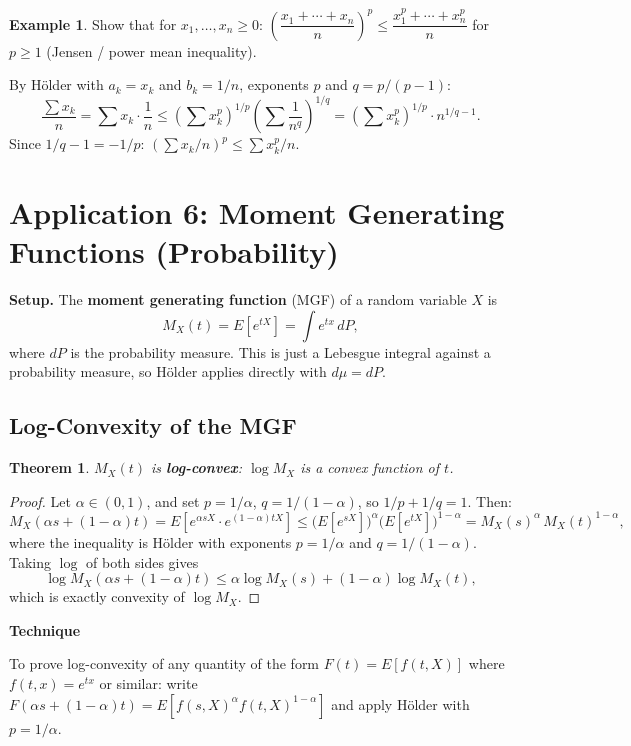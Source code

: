 \documentclass[11pt]{article}
\theoremstyle{myplain}
\newtheorem{theorem}{Theorem}
\theoremstyle{definition}
\newtheorem{example}{Example}
\theoremstyle{remark}
\newenvironment{technique}{%
  \par\smallskip
  \noindent\colorbox{Apricot}{\textbf{Technique}}\enspace\ignorespaces
}{\par\smallskip}
\begin{document}
\begin{example}
Show that for $x_1, \ldots, x_n \geq 0$: $\left(\dfrac{x_1 + \cdots + x_n}{n}\right)^p \leq \dfrac{x_1^p + \cdots + x_n^p}{n}$ for $p \geq 1$ (Jensen / power mean inequality).

By H\"{o}lder with $a_k = x_k$ and $b_k = 1/n$, exponents $p$ and $q = p/(p-1)$:
\[
  \frac{\sum x_k}{n} = \sum x_k \cdot \frac{1}{n} \leq \left(\sum x_k^p\right)^{1/p}\!\left(\sum \frac{1}{n^q}\right)^{1/q} = \left(\sum x_k^p\right)^{1/p} \cdot n^{1/q - 1}.
\]
Since $1/q - 1 = -1/p$: $\left(\sum x_k/n\right)^p \leq \sum x_k^p / n$.
\end{example}

\section{Application 6: Moment Generating Functions (Probability)}

\textbf{Setup.} The \textbf{moment generating function} (MGF) of a random variable $X$ is
\[
  M_X(t) = E[e^{tX}] = \int e^{tx}\,dP,
\]
where $dP$ is the probability measure. This is just a Lebesgue integral against a probability measure, so Hölder applies directly with $d\mu = dP$.

\subsection{Log-Convexity of the MGF}

\begin{theorem}
$M_X(t)$ is \textbf{log-convex}: $\log M_X$ is a convex function of $t$.
\end{theorem}

\begin{proof}
Let $\alpha \in (0,1)$, and set $p = 1/\alpha$, $q = 1/(1-\alpha)$, so $1/p + 1/q = 1$. Then:
\[
  M_X(\alpha s + (1-\alpha)t)
  = E\!\left[e^{\alpha s X} \cdot e^{(1-\alpha)tX}\right]
  \leq \bigl(E[e^{sX}]\bigr)^\alpha \bigl(E[e^{tX}]\bigr)^{1-\alpha}
  = M_X(s)^\alpha\, M_X(t)^{1-\alpha},
\]
where the inequality is Hölder with exponents $p = 1/\alpha$ and $q = 1/(1-\alpha)$.
Taking $\log$ of both sides gives
\[
  \log M_X(\alpha s + (1-\alpha)t) \leq \alpha \log M_X(s) + (1-\alpha)\log M_X(t),
\]
which is exactly convexity of $\log M_X$.
\end{proof}

\begin{technique}
To prove log-convexity of any quantity of the form $F(t) = E[f(t, X)]$ where $f(t,x) = e^{tx}$ or similar: write $F(\alpha s + (1-\alpha)t) = E[f(s,X)^\alpha f(t,X)^{1-\alpha}]$ and apply Hölder with $p = 1/\alpha$.
\end{technique}
\end{document}
